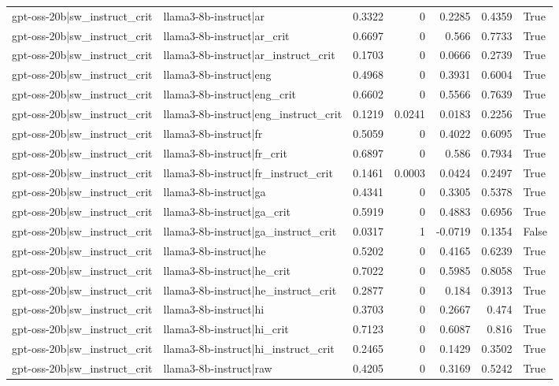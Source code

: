 \begin{table}
\begin{tabular}{l l r r r r l}
gpt-oss-20b|sw_instruct_crit & llama3-8b-instruct|ar & 0.3322 & 0 & 0.2285 & 0.4359 & True \\
gpt-oss-20b|sw_instruct_crit & llama3-8b-instruct|ar_crit & 0.6697 & 0 & 0.566 & 0.7733 & True \\
gpt-oss-20b|sw_instruct_crit & llama3-8b-instruct|ar_instruct_crit & 0.1703 & 0 & 0.0666 & 0.2739 & True \\
gpt-oss-20b|sw_instruct_crit & llama3-8b-instruct|eng & 0.4968 & 0 & 0.3931 & 0.6004 & True \\
gpt-oss-20b|sw_instruct_crit & llama3-8b-instruct|eng_crit & 0.6602 & 0 & 0.5566 & 0.7639 & True \\
gpt-oss-20b|sw_instruct_crit & llama3-8b-instruct|eng_instruct_crit & 0.1219 & 0.0241 & 0.0183 & 0.2256 & True \\
gpt-oss-20b|sw_instruct_crit & llama3-8b-instruct|fr & 0.5059 & 0 & 0.4022 & 0.6095 & True \\
gpt-oss-20b|sw_instruct_crit & llama3-8b-instruct|fr_crit & 0.6897 & 0 & 0.586 & 0.7934 & True \\
gpt-oss-20b|sw_instruct_crit & llama3-8b-instruct|fr_instruct_crit & 0.1461 & 0.0003 & 0.0424 & 0.2497 & True \\
gpt-oss-20b|sw_instruct_crit & llama3-8b-instruct|ga & 0.4341 & 0 & 0.3305 & 0.5378 & True \\
gpt-oss-20b|sw_instruct_crit & llama3-8b-instruct|ga_crit & 0.5919 & 0 & 0.4883 & 0.6956 & True \\
gpt-oss-20b|sw_instruct_crit & llama3-8b-instruct|ga_instruct_crit & 0.0317 & 1 & -0.0719 & 0.1354 & False \\
gpt-oss-20b|sw_instruct_crit & llama3-8b-instruct|he & 0.5202 & 0 & 0.4165 & 0.6239 & True \\
gpt-oss-20b|sw_instruct_crit & llama3-8b-instruct|he_crit & 0.7022 & 0 & 0.5985 & 0.8058 & True \\
gpt-oss-20b|sw_instruct_crit & llama3-8b-instruct|he_instruct_crit & 0.2877 & 0 & 0.184 & 0.3913 & True \\
gpt-oss-20b|sw_instruct_crit & llama3-8b-instruct|hi & 0.3703 & 0 & 0.2667 & 0.474 & True \\
gpt-oss-20b|sw_instruct_crit & llama3-8b-instruct|hi_crit & 0.7123 & 0 & 0.6087 & 0.816 & True \\
gpt-oss-20b|sw_instruct_crit & llama3-8b-instruct|hi_instruct_crit & 0.2465 & 0 & 0.1429 & 0.3502 & True \\
gpt-oss-20b|sw_instruct_crit & llama3-8b-instruct|raw & 0.4205 & 0 & 0.3169 & 0.5242 & True \\

\end{tabular}
\end{table}
